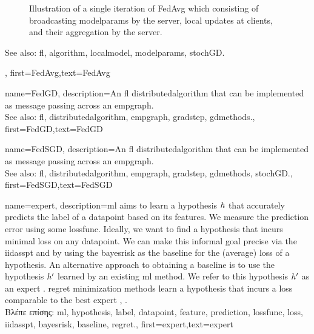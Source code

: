 {{\begin{figure}[H]
\begin{center}
	\end{center}
		\caption{Illustration of a single iteration of FedAvg which consisting of broadcasting \gls{modelparams} by the 
			server, local updates at clients, and their aggregation by the server. \label{fig_single_iteration_fedavg}} 
	\end{figure} 
		See also: \gls{fl}, \gls{algorithm}, \gls{localmodel}, \gls{modelparams}, \gls{stochGD}.},
	first={FedAvg},text={Fed\-Avg}
} 

{name={FedGD},
	description={An \gls{fl} \gls{distributedalgorithm} that 
		can be implemented as message passing across an \gls{empgraph}. 
		\\ 
		See also: \gls{fl}, \gls{distributedalgorithm}, \gls{empgraph}, \gls{gradstep}, \gls{gdmethods}.},
	first={FedGD},text={FedGD}
} 

{name={FedSGD},
	description={An \gls{fl} \gls{distributedalgorithm} that 
		can be implemented as message passing across an \gls{empgraph}. 
		\\ 
		See also: \gls{fl}, \gls{distributedalgorithm}, \gls{empgraph}, \gls{gradstep}, \gls{gdmethods}, \gls{stochGD}.},
	first={FedSGD},text={FedSGD}
} 

{name={expert},
	description={\gls{ml} aims to learn a \gls{hypothesis} $h$ that accurately predicts the \gls{label} 
		of a \gls{datapoint} based on its \gls{feature}s. We measure the \gls{prediction} error using 
		some \gls{lossfunc}. Ideally, we want to find a \gls{hypothesis} that incurs minimal \gls{loss} 
		on any \gls{datapoint}. We can make this informal goal precise via the \gls{iidasspt} 
		and by using the \gls{bayesrisk} as the \gls{baseline} for the (average) \gls{loss} of a \gls{hypothesis}. 
		An alternative approach to obtaining a \gls{baseline} is to use the \gls{hypothesis} $h'$ learned 
		by an existing \gls{ml} method. We refer to this \gls{hypothesis} $h'$ as an expert \cite{PredictionLearningGames}. \Gls{regret} minimization methods learn a \gls{hypothesis}
		that incurs a \gls{loss} comparable to the best expert \cite{PredictionLearningGames}, \cite{HazanOCO}.\\
		\foreignlanguage{greek}{Βλέπε επίσης:} \gls{ml}, \gls{hypothesis}, \gls{label}, \gls{datapoint}, \gls{feature}, \gls{prediction}, \gls{lossfunc}, \gls{loss}, \gls{iidasspt}, \gls{bayesrisk}, \gls{baseline}, \gls{regret}.},
	first={expert},text={expert} 
}

